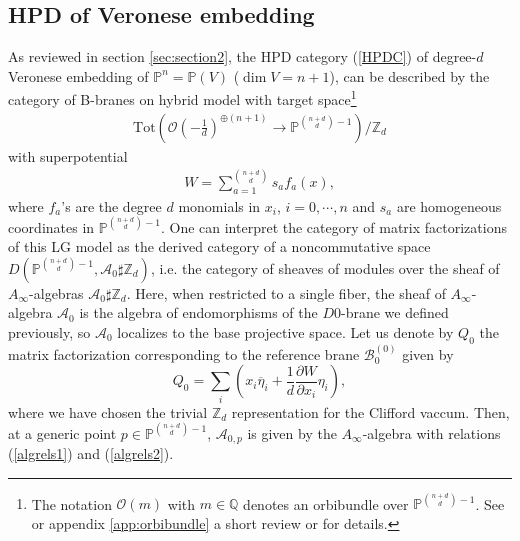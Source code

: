 \documentclass[a4paper,11pt]{article}
\def\cO{\mathcal{O}}
\def\cA{\mathcal{A}}
\newcommand{\Af}{{A_\infty}}
\newcommand{\bP}{{\mathbb{P}}}
\numberwithin{equation}{section}
\begin{document}
\subsection{HPD of Veronese embedding}\label{sec:HPDVeronese}

As reviewed in section \ref{sec:section2}, the HPD category (\ref{HPDC})  of 
degree-$d$ Veronese embedding of $\mathbb{P}^n= \bP(V)$ ($\dim 
V=n+1$), can be described by the category of B-branes 
on hybrid model with target space\footnote{The notation $\cO(m)$ with $m\in 
\mathbb{Q}$ denotes an orbibundle over $\mathbb{P}^{{n+d \choose d}-1}$. See 
\cite{Chen:2020iyo} or appendix \ref{app:orbibundle} a short review or 
\cite{adem_leida_ruan_2007} for 
details.} \cite{Chen:2020iyo}
\begin{eqnarray}\label{targethyb}
\mathrm{Tot}\left( \mathcal{O}\left( -\frac{1}{d} \right)^{\oplus(n+1)} \rightarrow \mathbb{P}^{{n+d \choose d}-1} \right)/\mathbb{Z}_d
\end{eqnarray} 
with superpotential
\begin{eqnarray}\label{superhyb}
W = \sum_{a=1}^{n+d \choose d} s_a f_a(x),
\end{eqnarray}
where $f_a$'s are the degree $d$ monomials in $x_i$, $i=0,\cdots,n$ and 
$s_{a}$ are homogeneous coordinates in $\mathbb{P}^{{n+d \choose d}-1}$. One 
can interpret the category of matrix factorizations of this LG model as the 
derived category of a noncommutative space $D(\mathbb{P}^{{n+d \choose d}-1}, 
\cA_0\sharp \mathbb{Z}_d)$, i.e. the category of sheaves of modules over the 
sheaf of $\Af$-algebras $\cA_0\sharp \mathbb{Z}_d$. Here, when restricted to a single fiber, the sheaf of $\Af$-algebra $\cA_0$ is the algebra of endomorphisms of the $D0$-brane we defined previously, so $\cA_0$ localizes to the base projective space. Let us denote by $Q_0$ the matrix factorization 
corresponding to the reference brane $\mathcal{B}^{(0)}_0$ given by
\begin{equation}
Q_0 = \sum_i \left(x_i \overline{\eta}_i + \frac{1}{d} \frac{\partial 
W}{\partial x_i} \eta_i \right),
\end{equation}
where we have chosen the trivial 
$\mathbb{Z}_{d}$ representation 
for the Clifford vaccum. Then, at a generic point $p\in \mathbb{P}^{{n+d 
\choose d}-1}$, $\mathcal{A}_{0,p}$ is given by the $A_{\infty}$-algebra with 
relations (\ref{algrels1}) and (\ref{algrels2}).
\end{document}
